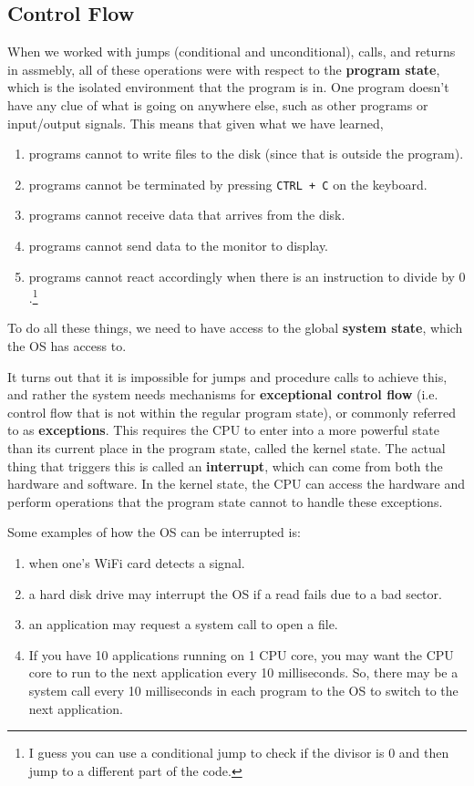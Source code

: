 \documentclass{article}
\newcounter{example}[section]
\newcounter{code}[section]
\begin{document}
  \subsection{Control Flow}

    When we worked with jumps (conditional and unconditional), calls, and returns in assmebly, all of these operations were with respect to the \textbf{program state}, which is the isolated environment that the program is in. One program doesn't have any clue of what is going on anywhere else, such as other programs or input/output signals. This means that given what we have learned, 
    \begin{enumerate}
      \item programs cannot to write files to the disk (since that is outside the program). 
      \item programs cannot be terminated by pressing \texttt{CTRL + C} on the keyboard. 
      \item programs cannot receive data that arrives from the disk. 
      \item programs cannot send data to the monitor to display. 
      \item programs cannot react accordingly when there is an instruction to divide by $0$.\footnote{I guess you can use a conditional jump to check if the divisor is $0$ and then jump to a different part of the code.}
    \end{enumerate}
    To do all these things, we need to have access to the global \textbf{system state}, which the OS has access to. 

    It turns out that it is impossible for jumps and procedure calls to achieve this, and rather the system needs mechanisms for \textbf{exceptional control flow} (i.e. control flow that is not within the regular program state), or commonly referred to as \textbf{exceptions}. This requires the CPU to enter into a more powerful state than its current place in the program state, called the kernel state. The actual thing that triggers this is called an \textbf{interrupt}, which can come from both the hardware and software. In the kernel state, the CPU can access the hardware and perform operations that the program state cannot to handle these exceptions. 

    \begin{example}[Interrupts]
      \label{ex:interrupts}
      Some examples of how the OS can be interrupted is: 
      \begin{enumerate}
        \item when one's WiFi card detects a signal. 
        \item a hard disk drive may interrupt the OS if a read fails due to a bad sector. 
        \item an application may request a system call to open a file. 
        \item If you have 10 applications running on 1 CPU core, you may want the CPU core to run to the next application every 10 milliseconds. So, there may be a system call every 10 milliseconds in each program to the OS to switch to the next application. 
      \end{enumerate}
    \end{example}
\end{document}
